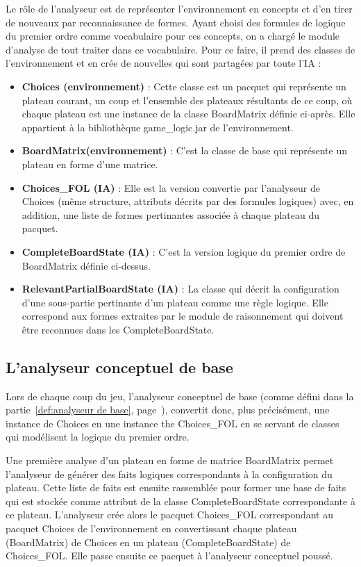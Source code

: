 Le rôle de l'analyseur est de représenter l'environnement en concepts et d'en tirer de nouveaux par reconnaissance de formes. Ayant choisi des formules de logique du premier ordre comme vocabulaire pour ces concepts, on a chargé le module d'analyse de tout traiter dans ce vocabulaire. Pour ce faire, il prend des classes de l'environnement et en crée de nouvelles qui sont partagées par toute l'IA :
\begin{itemize}
  \item \textbf {Choices (environnement)} : Cette classe est un pacquet qui représente un plateau courant, un coup et l'ensemble des plateaux résultants de ce coup, où chaque plateau est une instance de la classe BoardMatrix définie ci-après. Elle appartient à la bibliothèque game\_logic.jar de l'environnement.
  \item \textbf {BoardMatrix(environnement)} : C'est la classe de base qui représente un plateau en forme d'une matrice. 
  \item \textbf {Choices\_FOL (IA)} : Elle est la version convertie par l'analyseur de Choices (même structure, attributs décrits par des formules logiques) avec, en addition, une liste de formes pertinantes associée à chaque plateau du pacquet.
  \item \textbf {CompleteBoardState (IA)} : C'est la version logique du premier ordre de
  BoardMatrix définie ci-dessus.
  \item \textbf {RelevantPartialBoardState (IA)} : La classe qui décrit la configuration d'une sous-partie pertinante d'un plateau comme une règle logique. Elle correspond aux \og formes \fg{} extraites par le module de raisonnement qui doivent être reconnues dans les CompleteBoardState.
\end{itemize}
\subsection{L'analyseur conceptuel de base}
Lors de chaque coup du jeu, l'analyseur conceptuel de base (comme défini dans la partie~\ref{def:analyseur de base}, page~\pageref{def:analyseur de base}), convertit donc, plus précisément, une instance de Choices en une instance the Choices\_FOL en se servant de classes qui modélisent la logique du premier ordre. 

Une première analyse d'un plateau en forme de matrice BoardMatrix permet l'analyseur de générer des faits logiques correspondants à la configuration du plateau. Cette liste de faits est ensuite rassemblée pour former une base de faits qui est stockée comme attribut de la classe CompleteBoardState correspondante à ce plateau. L'analyseur crée alors le pacquet Choices\_FOL correspondant au pacquet Choices de l'environnement en convertissant chaque plateau (BoardMatrix) de Choices en un plateau (CompleteBoardState) de Choices\_FOL. Elle passe ensuite ce pacquet à l'analyseur conceptuel poussé. 
